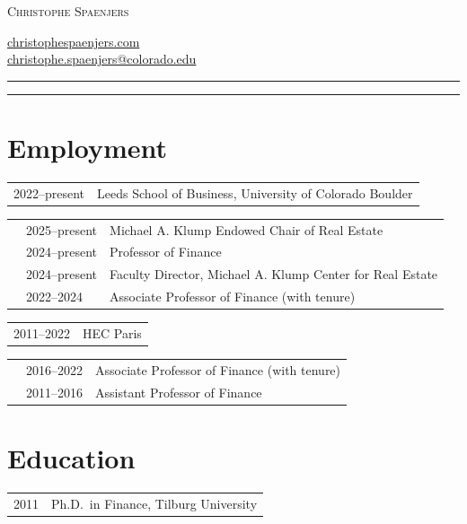 \documentclass[a4paper]{article}
\begin{document}
\begin{center}
\textsc{\LARGE Christophe Spaenjers}
\vskip 6pt

\href{http://christophespaenjers.com}{christophespaenjers.com} \\
\href{mailto:christophe.spaenjers@colorado.edu}{christophe.spaenjers@colorado.edu} \\ 

\end{center}

\hrule
\hrule

\smallskip


\section*{Employment}

\begin{tabular}{p{2cm} p{14.7cm}}
2022--present & Leeds School of Business, University of Colorado Boulder \\
\end{tabular}

\begin{tabular}{p{0.5cm} p{2cm} p{12.7cm}}
& 2025--present & Michael A. Klump Endowed Chair of Real Estate \\
& 2024--present & Professor of Finance \\
& 2024--present & Faculty Director, Michael A. Klump Center for Real Estate \\
& 2022--2024 & Associate Professor of Finance (with tenure) \\ [0.25cm]
\end{tabular}

\begin{tabular}{p{2cm} p{14.7cm}}
2011--2022 & HEC Paris \\
\end{tabular}

\begin{tabular}{p{0.5cm} p{2cm} p{12.7cm}}
& 2016--2022 & Associate Professor of Finance (with tenure) \\ 
& 2011--2016 & Assistant Professor of Finance \\
\end{tabular}


\section*{Education}

\iffalse 
\begin{tabular}{p{1cm} p{14.7cm}}
2011 & Ph.D.\ in Finance, Tilburg University\\
\end{tabular}
\end{document}
